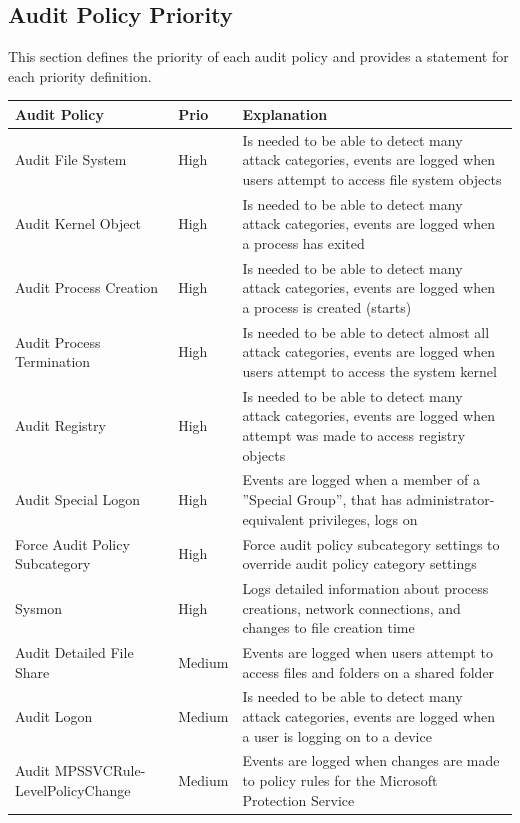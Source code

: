\subsection{Audit Policy Priority}\label{AuditPolicyPriority}
This section defines the priority of each audit policy and provides a statement for each priority definition. 
\def\arraystretch{1.5}
\begin{longtable}{| p{5cm} | p{1.5cm} | p{9.5cm} |} \hline 
        \textbf{Audit Policy} & \textbf{Prio} & \textbf{Explanation} \\ \hline
        Audit File System & High & Is needed to be able to detect many attack categories, events are logged when users attempt to access file system objects \\ \hline
        Audit Kernel Object & High & Is needed to be able to detect many attack categories, events are logged when a process has exited \\ \hline
        Audit Process Creation & High & Is needed to be able to detect many attack categories, events are logged when a process is created (starts)\\ \hline
        Audit Process Termination & High & Is needed to be able to detect almost all attack categories, events are logged when users attempt to access the system kernel \\ \hline
        Audit Registry & High & Is needed to be able to detect many attack categories, events are logged when attempt was made to access registry objects \\ \hline
        Audit Special Logon & High & Events are logged when a member of a ''Special Group'', that has administrator-equivalent privileges, logs on \\ \hline
        Force Audit Policy Subcategory & High & Force audit policy subcategory settings to override audit policy category settings\\ \hline
        Sysmon & High & Logs detailed information about process creations, network connections, and changes to file creation time \\ \hline
        Audit Detailed File Share & Medium & Events are logged when users attempt to access files and folders on a shared folder \\ \hline
        Audit Logon & Medium & Is needed to be able to detect many attack categories, events are logged when a user is logging on to a device \\ \hline
        Audit MPSSVCRule-LevelPolicyChange & Medium & Events are logged when changes are made to policy rules for the Microsoft Protection Service\\ \hline

\end{longtable}
